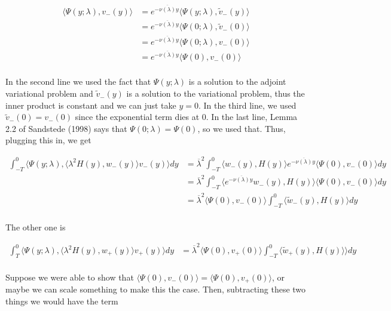 \documentclass[12pt]{article}
\begin{document}
\begin{enumerate}
\begin{align*}
\langle \Psi(y; \lambda), v_-(y) \rangle &= e^{-\overline{\nu(\lambda)}y} \langle \Psi(y; \lambda), \tilde{v}_-(y) \rangle \\
&= e^{-\overline{\nu(\lambda)}y} \langle \Psi(0; \lambda), \tilde{v}_-(0) \rangle \\
&= e^{-\overline{\nu(\lambda)}y} \langle \Psi(0; \lambda), v_-(0) \rangle \\
&= e^{-\overline{\nu(\lambda)}y} \langle \Psi(0), v_-(0) \rangle \\
\end{align*}

In the second line we used the fact that $\Psi(y; \lambda)$ is a solution to the adjoint variational problem and $\tilde{v}_-(y)$ is a solution to the variational problem, thus the inner product is constant and we can just take $y = 0$. In the third line, we used $\tilde{v}_-(0) = v_-(0)$ since the exponential term dies at 0. In the last line, Lemma 2.2 of Sandstede (1998) says that $\Psi(0; \lambda) = \Psi(0)$, so we used that. Thus, plugging this in, we get

\begin{align*}
\int_{-T}^0 
\langle \Psi(y; \lambda), \langle \lambda^2 H(y), w_-(y) \rangle v_-(y) \rangle dy &= 
\overline{\lambda}^2 \int_{-T}^0 \langle w_-(y), H(y) \rangle e^{-\overline{\nu(\lambda)}y} \langle \Psi(0), v_-(0) \rangle dy \\
&= \overline{\lambda}^2 \int_{-T}^0 \langle e^{-\overline{\nu(\lambda)}y} w_-(y), H(y) \rangle  \langle \Psi(0), v_-(0) \rangle dy \\
&= \overline{\lambda}^2  \langle \Psi(0), v_-(0) \rangle \int_{-T}^0 \langle \tilde{w}_-(y), H(y) \rangle  dy \\
\end{align*}

The other one is 

\begin{align*}
\int_{T}^0 
\langle \Psi(y; \lambda), \langle \lambda^2 H(y), w_+(y) \rangle v_+(y) \rangle dy &= 
\overline{\lambda}^2  \langle \Psi(0), v_+(0) \rangle \int_{-T}^0 \langle \tilde{w}_+(y), H(y) \rangle \rangle dy \\
\end{align*}

Suppose we were able to show that $\langle \Psi(0), v_-(0) \rangle = \langle \Psi(0), v_+(0) \rangle$, or maybe we can scale something to make this the case. Then, subtracting these two things we would have the term


\end{enumerate}
\end{document}
